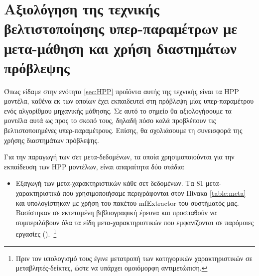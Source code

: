 \section{Αξιολόγηση της τεχνικής βελτιστοποίησης υπερ-παραμέτρων με μετα-μάθηση και χρήση διαστημάτων πρόβλεψης}
Όπως είδαμε στην ενότητα \ref{sec:HPP} προϊόντα αυτής της τεχνικής είναι τα \gls{HPP} μοντέλα, καθένα εκ των οποίων έχει εκπαιδευτεί στη πρόβλεψη μίας υπερ-παραμέτρου ενός αλγορίθμου μηχανικής μάθησης. Σε αυτό το σημείο θα αξιολογήσουμε τα μοντέλα αυτά ως προς το σκοπό τους, δηλαδή πόσο καλά προβλέπουν τις βελτιστοποιημένες υπερ-παραμέτρους. Επίσης, θα σχολιάσουμε τη συνεισφορά της χρήσης διαστημάτων πρόβλεψης.

Για την παραγωγή των σετ μετα-δεδομένων, τα οποία χρησιμοποιούνται για την εκπαίδευση των HPP μοντέλων, είναι απαραίτητα δύο στάδια:
\begin{itemize}
	\item Εξαγωγή των μετα-χαρακτηριστικών κάθε σετ δεδομένων. Τα  81 μετα-χαρακτηριστικά που χρησιμοποιήσαμε περιγράφονται στον Πίνακα \ref{table:meta} και υπολογίστηκαν με χρήση του πακέτου mf\-Extractor του συστήματός μας. Βασίστηκαν σε εκτεταμένη βιβλιογραφική έρευνα και προσπαθούν να συμπεριλάβουν όλα τα είδη μετα-χαρακτηριστικών που εμφανίζονται σε παρόμοιες εργασίες (\citep{Brazdil2009,Reif_meta2-features:,Feurer:2014:UMI:3015544.3015549}).~\footnote{Πριν τον υπολογισμό τους έγινε μετατροπή των κατηγορικών χαρακτηριστικών σε μεταβλητές-δείκτες, ώστε να υπάρχει ομοιόμορφη αντιμετώπιση.}   
		\begin{table}[!htb]
			\begin{center}
				\caption{Λίστα μετα-χαρακτηριστικών, τα οποία χρησιμοποιήθηκαν για την εκπαίδευση των HPP μοντέλων}
				\label{table:meta}
\end{center}
\end{table}
\end{itemize}
